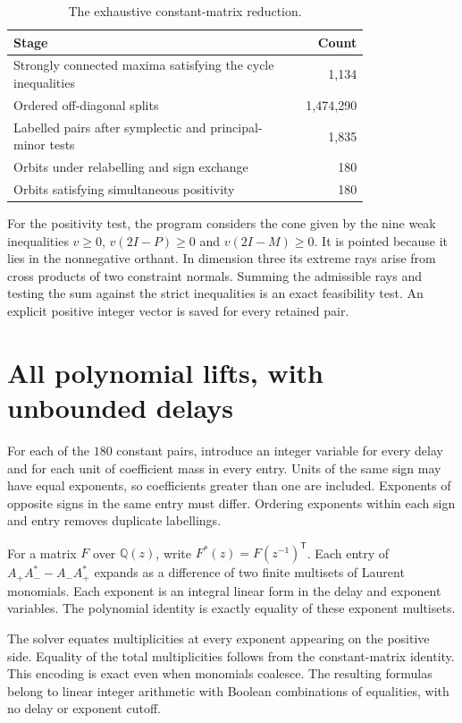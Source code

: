\documentclass[11pt,a4paper]{article}
\theoremstyle{definition}
\newcommand{\Q}{\mathbb Q}
\begin{document}
\begin{table}[ht]
\centering\small\renewcommand{\arraystretch}{1.15}
\begin{tabular}{@{}p{0.79\linewidth}r@{}}
\toprule
Stage & Count\\\midrule
Strongly connected maxima satisfying the cycle inequalities & 1,134\\
Ordered off-diagonal splits & 1,474,290\\
Labelled pairs after symplectic and principal-minor tests & 1,835\\
Orbits under relabelling and sign exchange & 180\\
Orbits satisfying simultaneous positivity & 180\\
\bottomrule
\end{tabular}
\caption{The exhaustive constant-matrix reduction.}\label{tab:counts}
\end{table}

For the positivity test, the program considers the cone given by the nine
weak inequalities $v\ge0$, $v(2I-P)\ge0$ and $v(2I-M)\ge0$. It is pointed
because it lies in the nonnegative orthant. In dimension three its extreme
rays arise from cross products of two constraint normals. Summing the
admissible rays and testing the sum against the strict inequalities is an
exact feasibility test. An explicit positive integer vector is saved for
every retained pair.

\section{All polynomial lifts, with unbounded delays}\label{sec:lifts}

For each of the $180$ constant pairs, introduce an integer variable for
every delay and for each unit of coefficient mass in every entry.
Units of the same sign may have equal exponents, so coefficients greater
than one are included. Exponents of opposite signs in the same entry must
differ. Ordering exponents within each sign and entry removes duplicate
labellings.

For a matrix $F$ over $\Q(z)$, write $F^*(z)=F(z^{-1})^{\mathsf T}$.
Each entry of $A_+A_-^*-A_-A_+^*$ expands as a difference of two finite
multisets of Laurent monomials. Each exponent is an integral linear form
in the delay and exponent variables. The polynomial identity is exactly
equality of these exponent multisets.

The solver equates multiplicities at every exponent appearing on the
positive side. Equality of the total multiplicities follows from the
constant-matrix identity. This encoding is exact even when monomials
coalesce. The resulting formulas belong to linear integer arithmetic with
Boolean combinations of equalities, with no delay or exponent cutoff.
\end{document}
